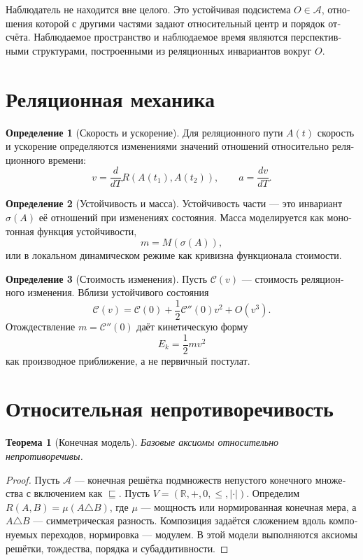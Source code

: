 \documentclass[11pt,a4paper]{article}
\theoremstyle{definition}
\newtheorem{definitionru}{Определение}[section]
\theoremstyle{plain}
\newtheorem{theoremru}{Теорема}[section]
\theoremstyle{remark}
\newcommand{\Parts}{\mathcal A}
\newcommand{\Rel}{R}
\newcommand{\Values}{V}
\newcommand{\PartOf}{\sqsubseteq}
\newcommand{\Stab}{\sigma}
\newcommand{\Cost}{\mathcal C}
\begin{document}
\begin{russian}
Наблюдатель не находится вне целого. Это устойчивая подсистема \(O\in\Parts\),
отношения которой с другими частями задают относительный центр и порядок
отсчёта. Наблюдаемое пространство и наблюдаемое время являются перспективными
структурами, построенными из реляционных инвариантов вокруг \(O\).

\section{Реляционная механика}

\begin{definitionru}[Скорость и ускорение]
Для реляционного пути \(A(t)\) скорость и ускорение определяются изменениями
значений отношений относительно реляционного времени:
\[
v=\frac{d}{dT}\Rel(A(t_1),A(t_2)),\qquad
a=\frac{dv}{dT}.
\]
\end{definitionru}

\begin{definitionru}[Устойчивость и масса]
Устойчивость части — это инвариант \(\Stab(A)\) её отношений при изменениях
состояния. Масса моделируется как монотонная функция устойчивости,
\[
m=M(\Stab(A)),
\]
или в локальном динамическом режиме как кривизна функционала стоимости.
\end{definitionru}

\begin{definitionru}[Стоимость изменения]
Пусть \(\Cost(v)\) — стоимость реляционного изменения. Вблизи устойчивого
состояния
\[
\Cost(v)=\Cost(0)+\frac12\Cost''(0)v^2+O(v^3).
\]
Отождествление \(m=\Cost''(0)\) даёт кинетическую форму
\[
E_k=\frac12mv^2
\]
как производное приближение, а не первичный постулат.
\end{definitionru}

\section{Относительная непротиворечивость}

\begin{theoremru}[Конечная модель]
Базовые аксиомы относительно непротиворечивы.
\end{theoremru}

\begin{proof}
Пусть \(\Parts\) — конечная решётка подмножеств непустого конечного множества с
включением как \(\PartOf\). Пусть
\(\Values=(\mathbb R,+,0,\leq,|\cdot|)\). Определим
\(\Rel(A,B)=\mu(A\triangle B)\), где \(\mu\) — мощность или нормированная
конечная мера, а \(A\triangle B\) — симметрическая разность. Композиция
задаётся сложением вдоль компонуемых переходов, нормировка — модулем. В этой
модели выполняются аксиомы решётки, тождества, порядка и субаддитивности.
\end{proof}


\end{russian}
\end{document}
